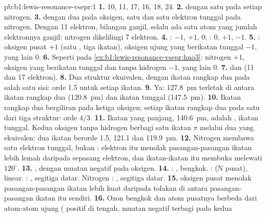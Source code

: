 \begin{solution}{pb:b1:lewis-resonance-vsepr:1}
\textbf{1.}  10,  11,  17,  16,  18,
 24.
\textbf{2.}  dengan satu  pada setiap
nitrogen.
\textbf{3.}  dengan dua  pada oksigen, satu
 dan satu elektron tunggal pada nitrogen. Dengan 11
elektron, bilangan ganjil, selalu ada satu atom yang jumlah elektronnya
ganjil: nitrogen dikelilingi 7 elektron.
\textbf{4.} : $-1$, $+1$, $0$; : $0$, $+1$, $-1$.
\textbf{5.} : oksigen pusat $+1$ (satu , tiga
ikatan), oksigen ujung yang berikatan tunggal $-1$, yang lain 0.
\textbf{6.} Seperti pada \cref{ex:b1:lewis-resonance-vsepr:hno3}:
nitrogen $+1$, oksigen yang berikatan tunggal dan tanpa hidrogen $-1$,
yang lain 0.
\textbf{7.}  dan  (11 dan 17 elektron).
\textbf{8.} Dua struktur ekuivalen, dengan ikatan rangkap dua pada salah
satu sisi: orde 1.5 untuk setiap ikatan.
\textbf{9.} Ya: \qty{127.8}{pm} terletak di antara ikatan rangkap dua
(\qty{120.8}{pm}) dan ikatan tunggal (\qty{147.5}{pm}).
\textbf{10.} Ikatan rangkap dua bergiliran pada ketiga oksigen; setiap
ikatan  rangkap dua pada satu dari tiga struktur: orde $4/3$.
\textbf{11.} Ikatan yang panjang, \qty{140.6}{pm}, adalah ,
ikatan tunggal. Kedua oksigen tanpa hidrogen berbagi satu ikatan $\pi$
melalui dua  yang ekuivalen: dua ikatan berorde 1.5,
121.1 dan \qty{119.9}{pm}.
\textbf{12.} Nitrogen membawa satu elektron tunggal, bukan : elektron itu menolak pasangan-pasangan ikatan lebih
lemah daripada sepasang elektron, dan ikatan-ikatan itu membuka melewati
$120^\circ$.
\textbf{13.} , dengan muatan negatif pada oksigen.
\textbf{14.} : , bengkok. :  (N pusat),
linear. : , segitiga datar. Nitrogen :
, segitiga datar.
\textbf{15.}  oksigen pusat menolak pasangan-pasangan
ikatan lebih kuat daripada tolakan di antara pasangan-pasangan ikatan
itu sendiri.
\textbf{16.} Ozon bengkok dan atom pusatnya berbeda dari atom-atom ujung
( positif di tengah, muatan negatif terbagi pada kedua

\end{solution}

